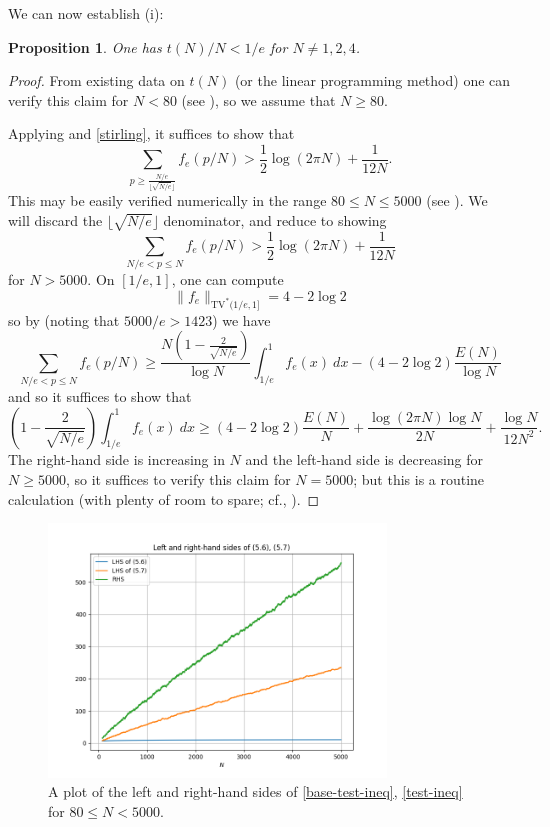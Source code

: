 \documentclass[12pt,a4paper,reqno]{amsart}
\numberwithin{equation}{section}
\theoremstyle{plain}
\newtheorem{proposition}[theorem]{Proposition}
\theoremstyle{definition}
\begin{document}
We can now establish (i): 

\begin{proposition}\label{tne} One has $t(N)/N < 1/e$ for $N \neq 1,2,4$.
\end{proposition}

\begin{proof}  From existing data on $t(N)$ (or the linear programming method) one can verify this claim for $N < 80$ (see ), so we assume that $N\geq 80$.
  
Applying  and \eqref{stirling}, it suffices to show that
\begin{equation}\label{base-test-ineq}
   \sum_{p \geq \frac{N/e}{\lfloor\sqrt{N/e}\rfloor}} f_{e}(p/N) > \frac{1}{2} \log(2\pi N) + \frac{1}{12N}.
\end{equation}
This may be easily verified numerically in the range $80 \leq N \leq 5000$ (see ).
We will discard the $\lfloor\sqrt{N/e}\rfloor$ denominator, and reduce to showing
\begin{equation}\label{test-ineq}
  \sum_{N/e < p \leq N} f_{e}(p/N) > \frac{1}{2} \log(2\pi N) + \frac{1}{12N}
\end{equation}
for $N > 5000$.  On $[1/e,1]$, one can compute
$$ \|f_e\|_{\mathrm{TV}^*(1/e,1]}
= 4 - 2 \log 2$$
so by  (noting that $5000/e > 1423$) we have
$$ \sum_{N/e < p \leq N} f_{e}(p/N) 
\geq \frac{N \left(1-\frac{2}{\sqrt{N/e}}\right)}{\log N} \int_{1/e}^1 f_e(x)\ dx - (4 - 2 \log 2) \frac{E(N)}{\log N}
$$
and so it suffices to show that
$$ \left(1 - \frac{2}{\sqrt{N/e}}\right) \int_{1/e}^1 f_e(x)\ dx \geq
(4 - 2 \log 2) \frac{E(N)}{N}
+ \frac{\log(2\pi N) \log N}{2N} + \frac{\log N}{12N^2}.$$
The right-hand side is increasing in $N$ and the left-hand side is decreasing for $N \geq 5000$, so it suffices to verify this claim for $N=5000$; but this is a routine calculation (with plenty of room to spare; cf., ).
\end{proof}

\begin{figure}
  \centering
  \includegraphics[width=0.8\textwidth]{lhs_rhs.png}
  \caption{A plot of the left and right-hand sides of \eqref{base-test-ineq}, \eqref{test-ineq} for $80 \leq N < 5000$.}\label{fig2}
\end{figure}
\end{document}

